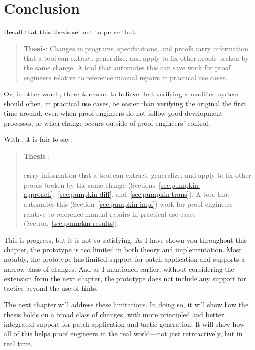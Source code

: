 \section{Conclusion}

Recall that this thesis set out to prove that:

\begin{quote}
\textbf{Thesis}: Changes in programs, specifications, and proofs carry information that a tool can extract, generalize, and apply to fix other proofs broken by the same change. A tool that automates this can save work for proof engineers relative to reference manual repairs in practical use cases.
\end{quote}
Or, in other words, there \textit{is} reason to believe that verifying a modified system should often, in practical use cases, be easier than verifying the original the first time around,
even when proof engineers do not follow good development processes,
or when change occurs outside of proof engineers' control.

With \sysname, it is fair to say:

\begin{quote}
\textbf{Thesis }:  \\
 \\
 carry information that a tool can extract, generalize, and  apply to fix other proofs broken by the same change (Sections~\ref{sec:pumpkin-approach},~\ref{sec:pumpkin-diff}, and~\ref{sec:pumpkin-trans}). A tool that automates this (Section~\ref{sec:pumpkin-impl})  work for proof engineers relative to reference manual repairs in  practical use cases (Section~\ref{sec:pumpkin-results}).
\end{quote}
This is progress, but it is not so satisfying.
As I have shown you throughout this chapter, the \sysname prototype is too limited in both theory and implementation.
Most notably, the \sysname prototype has limited support for patch application and supports
a narrow class of changes.
And as I mentioned earlier, without considering the extension from the next chapter, 
the \sysname prototype does not include any support for tactics beyond the use of hints.

The next chapter will address these limitations.
In doing so, it will show how the thesis holds on a broad class of changes,
with more principled and better integrated support for patch application and tactic generation.
It will show how all of this helps proof engineers in the real world---not just retroactively,
but in real time.






